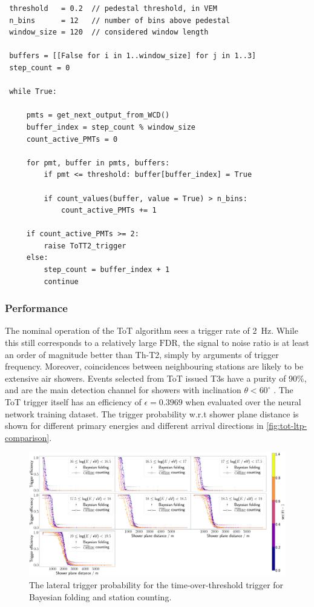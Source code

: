 \begin{lstlisting}
 threshold   = 0.2  // pedestal threshold, in VEM
 n_bins      = 12   // number of bins above pedestal
 window_size = 120  // considered window length

 buffers = [[False for i in 1..window_size] for j in 1..3] 
 step_count = 0

 while True:

     pmts = get_next_output_from_WCD()
     buffer_index = step_count % window_size
     count_active_PMTs = 0

     for pmt, buffer in pmts, buffers:
         if pmt <= threshold: buffer[buffer_index] = True

         if count_values(buffer, value = True) > n_bins:
             count_active_PMTs += 1

     if count_active_PMTs >= 2:
         raise ToTT2_trigger
     else:
         step_count = buffer_index + 1
         continue
\end{lstlisting}

\subsubsection{Performance}
\label{ssec:tot-performance}

The nominal operation of the ToT algorithm sees a trigger rate of \SI{2}{\hertz}. While this still corresponds to a relatively large $\text{FDR}$, the signal to 
noise ratio is at least an order of magnitude better than Th-T2, simply by arguments of trigger frequency. Moreover, coincidences between neighbouring stations are
likely to be extensive air showers. Events selected from ToT issued T3s have a purity of 90\%, and are the main detection channel for showers with inclination 
$\theta < 60^\circ$ \cite{abraham2010trigger}. The ToT trigger itself has an efficiency of $\epsilon = 0.3969$ when evaluated over the neural network training 
dataset. The trigger probability w.r.t shower plane distance is shown for different primary energies and different arrival directions in 
\autoref{fig:tot-ltp-comparison}.

\begin{figure}
	\centering
	\includegraphics[width=\textwidth]{./plots/tot_LTP_comparison.png}
	\caption{The lateral trigger probability for the time-over-threshold trigger for Bayesian folding and \Offline station counting.} 
	\label{fig:tot-ltp-comparison}
\end{figure}

